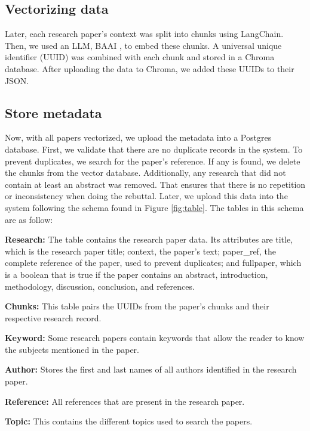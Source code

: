 \subsection{Vectorizing data}
Later, each research paper’s context was split into chunks using LangChain. Then, we used an LLM, BAAI \cite{bge_embedding}, to embed these chunks. A universal unique identifier (UUID) was combined with each chunk and stored in a Chroma \cite{chroma} database. After uploading the data to Chroma, we added these UUIDs to their JSON. 


\subsection{Store metadata}
Now, with all papers vectorized, we upload the metadata into a Postgres database. First, we validate that there are no duplicate records in the system. To prevent duplicates, we search for the paper's reference. If any is found, we delete the chunks from the vector database. Additionally, any research that did not contain at least an abstract was removed. That ensures that there is no repetition or inconsistency when doing the rebuttal. Later, we upload this data into the system following the schema found in Figure \ref{fig:table}. The tables in this schema are as follow:

\begin{description}
	\item{\textbf{Research:}}  The table contains the research paper data. Its attributes are title, which is the research paper title; context, the paper’s text; paper\_ref, the complete reference of the paper, used to prevent duplicates; and fullpaper, which is a boolean that is true if the paper contains an abstract, introduction, methodology, discussion, conclusion, and references.
	\item{\textbf{Chunks:}} This table pairs the UUIDs from the paper's chunks and their respective research record.  
	\item{\textbf{Keyword:}} Some research papers contain keywords that allow the reader to know the subjects mentioned in the paper. 
	\item{\textbf{Author:}} Stores the first and last names of all authors identified in the research paper. 
	\item{\textbf{Reference:}} All references that are present in the research paper.
	\item{\textbf{Topic:}} This contains the different topics used to search the papers.

\end{description}

